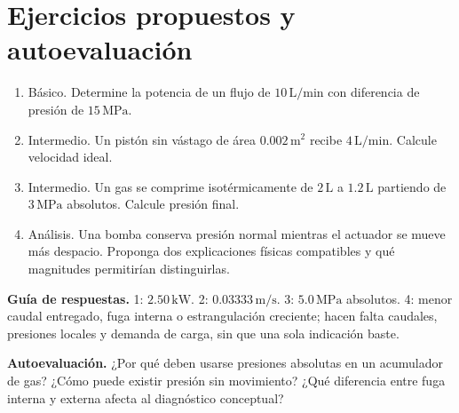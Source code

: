 \section{Ejercicios propuestos y autoevaluación}
\begin{enumerate}
\item Básico. Determine la potencia de un flujo de $10\,\mathrm{L/min}$ con diferencia de presión de $15\,\mathrm{MPa}$.
\item Intermedio. Un pistón sin vástago de área $0.002\,\mathrm{m^2}$ recibe $4\,\mathrm{L/min}$. Calcule velocidad ideal.
\item Intermedio. Un gas se comprime isotérmicamente de $2\,\mathrm{L}$ a $1.2\,\mathrm{L}$ partiendo de $3\,\mathrm{MPa}$ absolutos. Calcule presión final.
\item Análisis. Una bomba conserva presión normal mientras el actuador se mueve más despacio. Proponga dos explicaciones físicas compatibles y qué magnitudes permitirían distinguirlas.
\end{enumerate}
\textbf{Guía de respuestas.} 1: $2.50\,\mathrm{kW}$. 2: $0.03333\,\mathrm{m/s}$. 3: $5.0\,\mathrm{MPa}$ absolutos. 4: menor caudal entregado, fuga interna o estrangulación creciente; hacen falta caudales, presiones locales y demanda de carga, sin que una sola indicación baste.

\textbf{Autoevaluación.} ¿Por qué deben usarse presiones absolutas en un acumulador de gas? ¿Cómo puede existir presión sin movimiento? ¿Qué diferencia entre fuga interna y externa afecta al diagnóstico conceptual?
